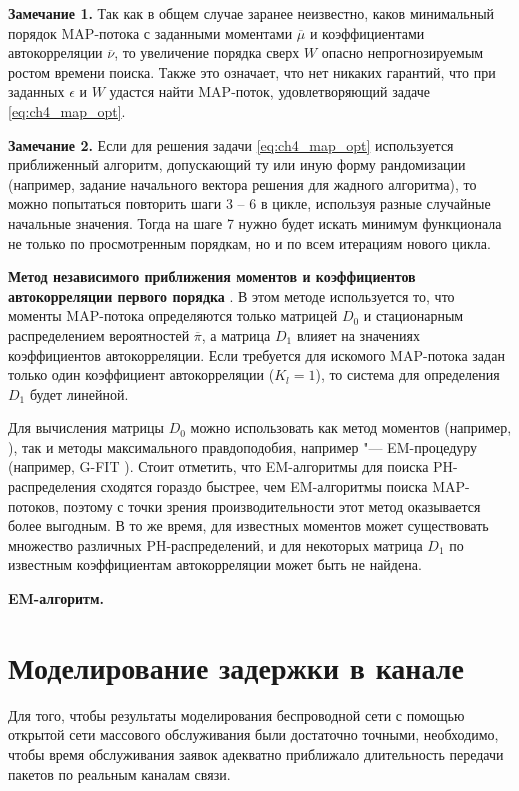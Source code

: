 \textbf{Замечание 1.} Так как в общем случае заранее неизвестно, каков минимальный порядок MAP-потока с заданными моментами $\overline{\mu}$ и коэффициентами автокорреляции $\overline{\nu}$, то увеличение порядка сверх $W$ опасно непрогнозируемым ростом времени поиска. Также это означает, что нет никаких гарантий, что при заданных $\epsilon$ и $W$ удастся найти MAP-поток, удовлетворяющий задаче \eqref{eq:ch4_map_opt}.

\textbf{Замечание 2.} Если для решения задачи \eqref{eq:ch4_map_opt} используется приближенный алгоритм, допускающий ту или иную форму рандомизации (например, задание начального вектора решения для жадного алгоритма), то можно попытаться повторить шаги 3 -- 6 в цикле, используя разные случайные начальные значения. Тогда на шаге 7 нужно будет искать минимум функционала не только по просмотренным порядкам, но и по всем итерациям нового цикла.


\textbf{Метод независимого приближения моментов и коэффициентов автокорреляции первого порядка} \cite{Horvath2005}. В этом методе используется то, что моменты MAP-потока определяются только матрицей $D_0$ и стационарным распределением вероятностей $\overline{\pi}$, а матрица $D_1$ влияет на значениях коэффициентов автокорреляции. Если требуется для искомого MAP-потока задан только один коэффициент автокорреляции ($K_l = 1$), то система для определения $D_1$ будет линейной.

Для вычисления матрицы $D_0$ можно использовать как метод моментов (например, \cite{Bobbio2005}), так и методы максимального правдоподобия, например "--- EM-процедуру (например, G-FIT \cite{Thummler2005}). Стоит отметить, что EM-алгоритмы для поиска PH-распределения сходятся гораздо быстрее, чем EM-алгоритмы поиска MAP-потоков, поэтому с точки зрения производительности этот метод оказывается более выгодным. В то же время, для известных моментов может существовать множество различных PH-распределений, и для некоторых матрица $D_1$ по известным коэффициентам автокорреляции может быть не найдена.




\textbf{EM-алгоритм.}







\section{Моделирование задержки в канале}\label{sec:ch4_service_time}
Для того, чтобы результаты моделирования беспроводной сети с помощью открытой сети массового обслуживания были достаточно точными, необходимо, чтобы время обслуживания заявок адекватно приближало длительность передачи пакетов по реальным каналам связи.

